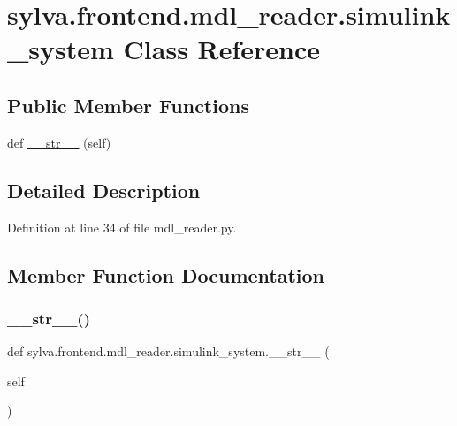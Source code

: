 \hypertarget{classsylva_1_1frontend_1_1mdl__reader_1_1simulink__system}{}\section{sylva.\+frontend.\+mdl\+\_\+reader.\+simulink\+\_\+system Class Reference}
\label{classsylva_1_1frontend_1_1mdl__reader_1_1simulink__system}
\subsection*{Public Member Functions}
\begin{DoxyCompactItemize}
\item 
def \hyperlink{classsylva_1_1frontend_1_1mdl__reader_1_1simulink__system_a39c8b50a736f2a595ffdccdd529cd744}{\+\_\+\+\_\+str\+\_\+\+\_\+} (self)
\end{DoxyCompactItemize}


\subsection{Detailed Description}


Definition at line 34 of file mdl\+\_\+reader.\+py.



\subsection{Member Function Documentation}
\mbox{\label{classsylva_1_1frontend_1_1mdl__reader_1_1simulink__system_a39c8b50a736f2a595ffdccdd529cd744}} 
\subsubsection{\texorpdfstring{\+\_\+\+\_\+str\+\_\+\+\_\+()}{\_\_str\_\_()}}
{\footnotesize\ttfamily def sylva.\+frontend.\+mdl\+\_\+reader.\+simulink\+\_\+system.\+\_\+\+\_\+str\+\_\+\+\_\+ (\begin{DoxyParamCaption}\item[{}]{self }\end{DoxyParamCaption})}




